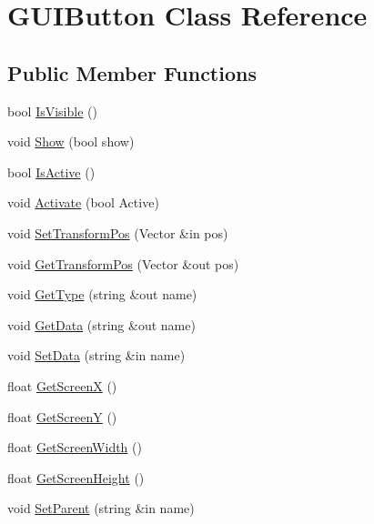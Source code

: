 \hypertarget{class_g_u_i_button}{}\section{G\+U\+I\+Button Class Reference}
\label{class_g_u_i_button}
\subsection*{Public Member Functions}
\begin{DoxyCompactItemize}
\item 
bool \hyperlink{class_g_u_i_button_aaad932d78dd25b83b9951bda17c77e39}{Is\+Visible} ()
\item 
void \hyperlink{class_g_u_i_button_ab97b9d35108671239706fcc98fbb829f}{Show} (bool show)
\item 
bool \hyperlink{class_g_u_i_button_abe241935b3e7eb3fcb82628b4fcb3632}{Is\+Active} ()
\item 
void \hyperlink{class_g_u_i_button_a76d0c53b84ad511029dfe4d2d7225d20}{Activate} (bool Active)
\item 
void \hyperlink{class_g_u_i_button_a79055c801ba8bf114e6c09ff684afda3}{Set\+Transform\+Pos} (Vector \&in pos)
\item 
void \hyperlink{class_g_u_i_button_a32f75c0a9ef5081dcb85b666b350c530}{Get\+Transform\+Pos} (Vector \&out pos)
\item 
void \hyperlink{class_g_u_i_button_a40cd0e7024e6b16a88150c688e77346f}{Get\+Type} (string \&out name)
\item 
void \hyperlink{class_g_u_i_button_ab29545ca5ba5d67410cfc838a5ada506}{Get\+Data} (string \&out name)
\item 
void \hyperlink{class_g_u_i_button_a2b498afa88bf44ad48ea25493f7a7d16}{Set\+Data} (string \&in name)
\item 
float \hyperlink{class_g_u_i_button_af020b82c81490952a958c845963aea0e}{Get\+ScreenX} ()
\item 
float \hyperlink{class_g_u_i_button_a98a966e695a669d884228ff339953044}{Get\+ScreenY} ()
\item 
float \hyperlink{class_g_u_i_button_ada428e9766e32d80b753cde68a432bd2}{Get\+Screen\+Width} ()
\item 
float \hyperlink{class_g_u_i_button_aa4b1f9dc14cb6fd44479ea4b85896e62}{Get\+Screen\+Height} ()
\item 
void \hyperlink{class_g_u_i_button_ae7a165dcbaab5f0a8eac523efe5447d2}{Set\+Parent} (string \&in name)
\item 

\end{DoxyCompactItemize}
